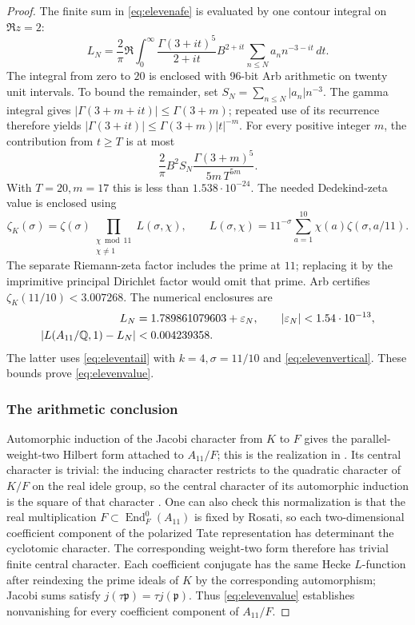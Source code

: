 \begin{proof}
The finite sum in \eqref{eq:elevenafe} is evaluated by one contour
integral on $\Re z=2$:
\begin{equation}
L_N=\frac2\pi\Re\int_0^\infty
 \frac{\Gamma(3+it)^5}{2+it}
 B^{2+it}\sum_{n\leq N}a_nn^{-3-it}\,dt.
\label{eq:elevencontour}
\end{equation}
The integral from zero to $20$ is enclosed with 96-bit Arb arithmetic
on twenty unit intervals. To bound the remainder, set
$S_N=\sum_{n\leq N}|a_n|n^{-3}$. The gamma integral gives
$|\Gamma(3+m+it)|\leq\Gamma(3+m)$; repeated use of its recurrence
therefore yields
$|\Gamma(3+it)|\leq\Gamma(3+m)|t|^{-m}$.
For every positive integer $m$, the contribution from $t\geq T$ is
at most
\begin{equation}
\frac2\pi B^2S_N\frac{\Gamma(3+m)^5}{5m\,T^{5m}}.
\label{eq:elevenvertical}
\end{equation}
With $T=20,m=17$ this is less than $1.538\cdot10^{-24}$.
The needed Dedekind-zeta value is enclosed using
\[
\zeta_K(\sigma)=\zeta(\sigma)
 \prod_{\substack{\chi\bmod11\\\chi\ne1}}L(\sigma,\chi),\qquad
L(\sigma,\chi)=11^{-\sigma}\sum_{a=1}^{10}
                           \chi(a)\zeta(\sigma,a/11).
\]
The separate Riemann-zeta factor includes the prime at $11$; replacing
it by the imprimitive principal Dirichlet factor would omit that prime.
Arb certifies $\zeta_K(11/10)<3.007268$.
The numerical enclosures are
\[
\begin{split}
L_N&=1.789861079603+\varepsilon_N,
                    \qquad |\varepsilon_N|<1.54\cdot10^{-13},\\
|L(A_{11}/\mathbb Q,1)-L_N|&<0.004239358.
\end{split}
\]
The latter uses \eqref{eq:eleventail} with $k=4,\sigma=11/10$ and
\eqref{eq:elevenvertical}. These bounds prove \eqref{eq:elevenvalue}.

\subsubsection{The arithmetic conclusion}

Automorphic induction of the Jacobi character from $K$ to $F$ gives
the parallel-weight-two Hilbert form attached to $A_{11}/F$;
this is the realization in \citet[\S2.2]{ShuExpanded2021}.
Its central character is trivial: the inducing character restricts to the
quadratic character of $K/F$ on the real idele group, so the central
character of its automorphic induction is the square of that character
\citep[\S3.4, p.~15]{ShuExpanded2021}. One can also check this normalization
is that the real multiplication $F\subset\operatorname{End}_F^0(A_{11})$
is fixed by Rosati, so each two-dimensional coefficient component of
the polarized Tate representation has determinant the cyclotomic
character. The corresponding weight-two form therefore has trivial
finite central character. Each coefficient conjugate has the same
Hecke $L$-function after reindexing the prime ideals of $K$ by the
corresponding automorphism; Jacobi sums satisfy
$j(\tau\mathfrak p)=\tau j(\mathfrak p)$.
Thus \eqref{eq:elevenvalue} establishes nonvanishing for every
coefficient component of $A_{11}/F$.


\end{proof}
